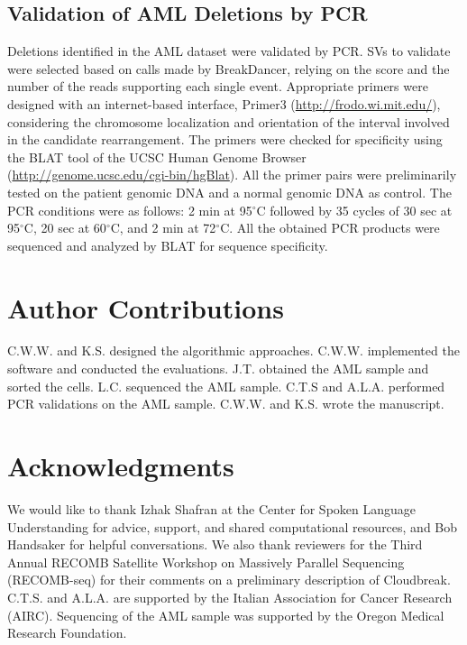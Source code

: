 \documentclass[11pt]{article}
\newcommand{\degree}{\ensuremath{^\circ}}
\begin{document}
\subsection{Validation of AML Deletions by PCR}

Deletions identified in the AML dataset were validated by PCR. SVs to validate were selected based on calls made by BreakDancer, relying on the score and the number of the reads supporting each single event. Appropriate primers were designed with an internet-based interface, Primer3 (\url{http://frodo.wi.mit.edu/}), considering the chromosome localization and orientation of the interval involved in the candidate rearrangement. The primers were checked for specificity using the BLAT tool of the UCSC Human Genome Browser (\url{http://genome.ucsc.edu/cgi-bin/hgBlat}). All the primer pairs were preliminarily tested on the patient genomic DNA and a normal genomic DNA as control. The PCR conditions were as follows: 2 min at 95\degree C followed by 35 cycles of 30 sec at 95\degree C, 20 sec at 60\degree C, and 2 min at 72\degree C. All the obtained PCR products were sequenced and analyzed by BLAT for sequence specificity. 


\newpage

\section{Author Contributions}

C.W.W. and K.S. designed the algorithmic approaches. C.W.W. implemented the software and conducted the evaluations. J.T. obtained the AML sample and sorted the cells. L.C. sequenced the AML sample. C.T.S and A.L.A. performed PCR validations on the AML sample. C.W.W. and K.S. wrote the manuscript.

\section*{Acknowledgments}

We would like to thank Izhak Shafran at the Center for Spoken Language Understanding for advice, support, and shared computational resources, and Bob Handsaker for helpful conversations. We also thank reviewers for the Third Annual RECOMB Satellite Workshop on Massively Parallel Sequencing (RECOMB-seq) for their comments on a preliminary description of Cloudbreak. C.T.S. and A.L.A. are supported by the Italian Association for Cancer Research (AIRC). Sequencing of the AML sample was supported by the Oregon Medical Research Foundation. 
\end{document}
